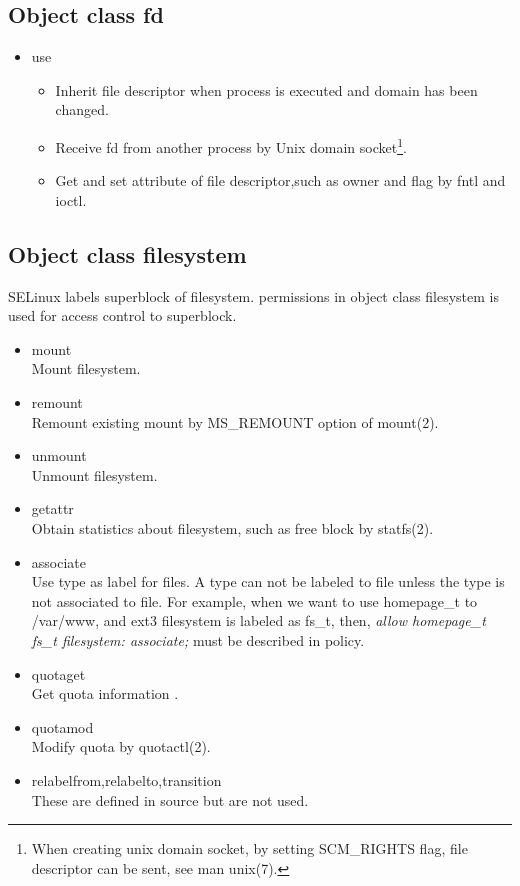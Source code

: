 \documentclass{article}
\begin{document}
\subsection{Object class fd}
\begin{itemize}
 \item use\\
       \begin{itemize}
	\item Inherit file descriptor when process is executed and
	      domain has been changed.
	\item Receive fd from another  process by Unix domain socket\footnote{When creating unix domain
	      socket, by setting SCM\_RIGHTS flag, file descriptor can be sent,
	      see man unix(7).}.
	\item Get and set attribute of file descriptor,such as owner and flag
	      by fntl and ioctl.
       \end{itemize}       
\end{itemize}

\subsection{Object class filesystem}
SELinux labels superblock of filesystem. permissions in object class
filesystem is used for access control to superblock. 
\begin{itemize}
 \item mount\\
       Mount filesystem.
 \item remount\\
       Remount existing mount by MS\_REMOUNT option of mount(2).
 \item unmount\\
       Unmount filesystem.
 \item getattr\\
       Obtain statistics
       about filesystem, such as free block by statfs(2).
 \item associate\\
       Use type as label for files. A type can not be labeled to file unless the type is not
       associated to file. For example, when we want to use homepage\_t to
       /var/www, and ext3 filesystem is labeled as fs\_t,  then, {\it allow homepage\_t fs\_t filesystem:
       associate; } must be described in policy. 
 \item quotaget\\
       Get quota information .
 \item 	quotamod\\
       Modify quota by quotactl(2).
 \item relabelfrom,relabelto,transition \\
       These are defined in source but are not used.
\end{itemize}
\end{document}
